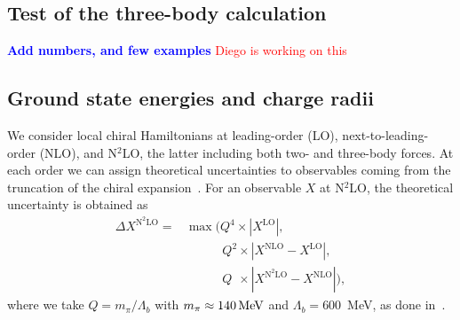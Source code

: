 \documentclass[aps,prc,twocolumn,superscriptaddress,showpacs,floatfix,nofootinbib]{revtex4-1}
\newcommand{\red}[1]{\protect\textcolor{red}{#1}}
\newcommand{\blue}[1]{\protect\textcolor{blue}{#1}}
\begin{document}
\subsection{Test of the three-body calculation}
\blue{\bf Add numbers, and few examples}
\red{Diego is working on this}


\subsection{Ground state energies and charge radii}
We consider local chiral Hamiltonians at leading-order (LO), 
next-to-leading-order (NLO), and N$^2$LO, the latter including both two- and three-body forces.
At each order we can assign theoretical uncertainties to observables coming from the 
truncation of the chiral expansion~\cite{Epelbaum:2015epja}. For an observable $X$ at N$^2$LO, 
the theoretical uncertainty is obtained as
\begin{align}
\Delta X^{\text{N}^2\text{LO}}=&\max(Q^4\times|X^{\text{LO}}|,\nonumber \\ 
&\phantom{\max(\,}Q^2\times|X^{\text{NLO}}-X^{\text{LO}}|, \nonumber \\
&\phantom{\max(\,}Q^{\phantom{2}}\times|X^{\text{N}^2\text{LO}}-X^{\text{NLO}}|),
\label{eq:err}
\end{align}
where we take $Q=m_\pi/\Lambda_b$ with $m_\pi\approx140\,\rm MeV$ and $\Lambda_b=600$~MeV, 
as done in~\cite{Lynn:2016,Lonardoni:2017afdmc}.
\end{document}
